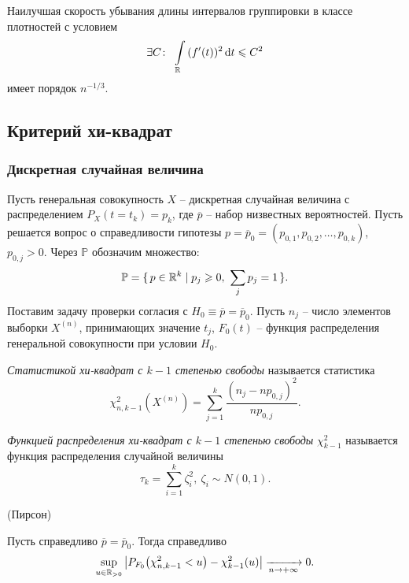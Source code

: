 \begin{theorem}
    Наилучшая скорость убывания длины интервалов группировки в классе плотностей
    с условием
    \[
        \exists C\colon~ \int\limits_{\mathbb{R}}{(f'(t))^2 \,\mathrm{d} t} \leqslant C^2
    \]
    имеет порядок $n^{-1/3}$.
\end{theorem}

\subsection{Критерий хи-квадрат}

\subsubsection{Дискретная случайная величина}
Пусть генеральная совокупность $X$ -- дискретная случайная величина с
распределением $P_X(t = t_k) = p_k$, где $\overline{p}$ -- набор низвестных
вероятностей. Пусть решается вопрос о справедливости гипотезы
$p = \overline{p}_0 = (p_{0, 1}, p_{0, 2}, \ldots, p_{0, k})$, $p_{0, j} > 0$.
Через $\mathbb{P}$ обозначим множество:
\[
    \mathbb{P} = \{\,p \in \mathbb{R}^k \mid p_j \geqslant 0,~ \sum_j{p_j} = 1 \,\}
.\]
Поставим задачу проверки согласия с $H_0 \equiv \overline{p} = \overline{p}_0$.
Пусть $n_j$ -- число элементов выборки $X^{(n)}$, принимающих значение $t_j$,
$F_0(t)$ -- функция распределения генеральной совокупности при условии $H_0$.

\begin{definition}
    \textit{Статистикой хи-квадрат с $k - 1$ степенью свободы} называется
    статистика
    \[
        \chi^2_{n, k - 1}(X^{(n)}) =
        \sum_{j = 1}^k{\frac{(n_j - n p_{0, j})^2}{np_{0, j}}}
    .\]
\end{definition}

\begin{definition}
    \textit{Функцией распределения хи-квадрат с $k - 1$ степенью свободы}
    $\chi^2_{k - 1}$ называется функция распределения случайной величины
    \[
        \tau_k = \sum_{i = 1}^k{\zeta^2_i},~ \zeta_i \sim N(0, 1)
    .\]
\end{definition}

\begin{theorem}(Пирсон)

    Пусть справедливо $\overline{p} = \overline{p}_0$. Тогда справедливо
    \[
        \sup_{u \in \R_{>0}}{\abs*{P_{F_0}\parens*{\chi^2_{n, k - 1} < u}
        - \chi^2_{k - 1}(u)}}
        \xrightarrow[n \to +\infty]{} 0
    .\]
\end{theorem}

